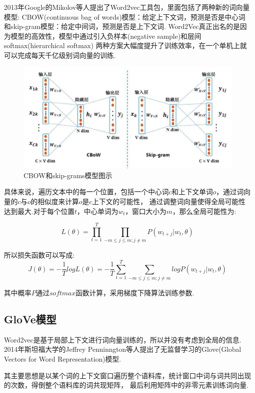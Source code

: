\documentclass[bachelor,adobefonts]{jnuthesis}
\begin{document}
2013年Google的Mikolov等人提出了Word2vec工具包\cite{Mikolov2013Distributed}，里面包括了两种新的词向量模型:
CBOW(continuous bag of words)模型：给定上下文词，预测是否是中心词
和skip-gram模型：给定中间词，预测是否是上下文词.
Word2Vec真正出名的是因为模型的高效性，模型中通过引入负样本(negative sample)和层间softmax(hierarchical softmax)
两种方案大幅度提升了训练效率，在一个单机上就可以完成每天千亿级别词向量的训练.

\begin{figure}[h!]
  \centering
  \includegraphics[width=0.6\linewidth]{CBOW-skip-gram.png}
  \caption{CBOW和skip-grams模型图示}
\end{figure}

具体来说，遍历文本中的每一个位置，包括一个中心词$c$和上下文单词$o$，通过词向量的$c$与$o$的相似度来计算$o$是$c$上下文的可能性，
通过调整词向量使得全局可能性达到最大.对于每个位置$t$，中心单词为$w_{t}$，窗口大小为$m$，那么全局可能性为:

\begin{equation}
  L(\theta) = \prod_{t=1}^{T} \prod_{-m \le j \le m ;j \neq m} P(w_{t+j}|w_{t},\theta)
\end{equation}

所以损失函数可以写成:
\begin{equation}
  J(\theta) = -\frac{1}{T}logL(\theta) = -\frac{1}{T} \sum_{t=1}^{T} \sum_{-m \le j \le m ;j \neq m} log P(w_{t+j}|w_{t},\theta)
\end{equation}

其中概率$P$通过$softmax$函数计算，采用梯度下降算法训练参数.

\subsection{GloVe模型}
Word2vec是基于局部上下文进行词向量训练的，所以并没有考虑到全局的信息.
2014年斯坦福大学的Jeffrey Penninngton等人\cite{Pennington2014Glove}提出了无监督学习的Glove(Global Vectors for Word Representation)模型.

其主要思想是以某个词的上下文窗口遍历整个语料库，统计窗口中词与词共同出现的次数，得倒整个语料库的词共现矩阵，
最后利用矩阵中的非零元素训练词向量.
\end{document}
